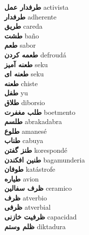 \textbf{ طرفدار عمل  } activista \\
\textbf{ طرفدار  } adherente \\
\textbf{ طریق  } careda \\
\textbf{ طشت  } baño \\
\textbf{ طعم  } sabor \\
\textbf{ طعمه کردن  } defroudá \\
\textbf{ طعنه آمیز  } seku \\
\textbf{ طعنه ای  } seku \\
\textbf{ طعنه  } chiste \\
\textbf{ طفل  } yu \\
\textbf{ طلاق  } diborsio \\
\textbf{ طلب مغفرت  } boetmento \\
\textbf{ طلسم  } abrakadabra \\
\textbf{ طلوع  } amanesé \\
\textbf{ طناب  } cabuya \\
\textbf{ طنز گفتن  } korespondé \\
\textbf{ طنین افکندن  } bagamunderia \\
\textbf{ طوفان  } katástrofe \\
\textbf{ طیاره  } avion \\
\textbf{ ظرف سفالین  } ceramico \\
\textbf{ ظرف  } atverbio \\
\textbf{ ظرفی  } atverbial \\
\textbf{ ظرفیت خازنی  } capacidad \\
\textbf{ ظلم وستم  } diktadura \\
